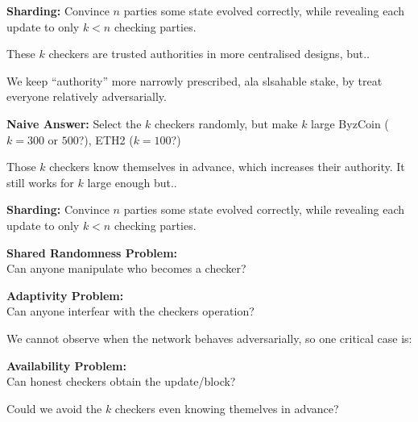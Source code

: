 \documentclass{beamer}
\begin{document}
\begin{frame}[t]

{\bf Sharding:}  Convince $n$ parties some state evolved correctly, while revealing each update to only $k<n$ checking parties.

\bigskip\bigskip
These $k$ checkers are trusted authorities in more centralised designs, but..

\medskip

We keep ``authority'' more narrowly prescribed, ala slsahable stake,
by treat everyone relatively adversarially. 

\pause
\bigskip\bigskip

{\bf Naive Answer:}   
Select the $k$ checkers randomly, but make $k$ large
\hspace*{3pt} ByzCoin ($k=300$ or $500$?), ETH2 ($k=100$?)

\medskip

Those $k$ checkers know themselves in advance, which increases their authority.
It still works for $k$ large enough but..

\end{frame}


\begin{frame}[t]

{\bf Sharding:}  Convince $n$ parties some state evolved correctly, while revealing each update to only $k<n$ checking parties.

\bigskip\bigskip

{\bf Shared Randomness Problem:}  \\
Can anyone manipulate who becomes a checker?

\bigskip\bigskip

{\bf Adaptivity Problem:}  \\
Can anyone interfear with the checkers operation?

\bigskip
We cannot observe when the network behaves adversarially, so one critical case is:

{\bf Availability Problem:}  \\
Can honest checkers obtain the update/block?  

\pause
\bigskip\bigskip

Could we avoid the $k$ checkers even knowing themelves in advance? 

\end{frame}
\end{document}
